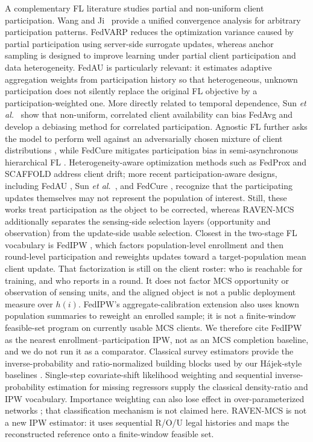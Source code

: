\documentclass[letterpaper,journal]{IEEEtran}
\begin{document}
A complementary FL literature studies partial and non-uniform client
participation.  Wang and Ji~\cite{wang2022unified} provide a unified convergence
analysis for arbitrary participation patterns.  FedVARP
\cite{jhunjhunwala2022fedvarp} reduces the optimization variance caused by
partial participation using server-side surrogate updates, whereas anchor
sampling \cite{wu2023anchor} is designed to improve learning under partial
client participation and data heterogeneity.  FedAU
\cite{wang2024lightweight} is particularly relevant: it estimates adaptive
aggregation weights from participation history so that heterogeneous,
unknown participation does not silently replace the original FL objective by
a participation-weighted one.  More directly related to temporal dependence,
Sun \emph{et al.}~\cite{sun2025debiasing} show that non-uniform, correlated
client availability can bias FedAvg and develop a debiasing method for
correlated participation.  Agnostic FL further asks the model to perform well
against an adversarially chosen mixture of client distributions
\cite{mohri2019agnostic}, while FedCure mitigates participation bias in
semi-asynchronous hierarchical FL \cite{chen2026fedcure}.  Heterogeneity-aware
optimization methods such as FedProx and SCAFFOLD
\cite{li2020fedprox,karimireddy2020scaffold} address client drift; more recent
participation-aware designs, including FedAU \cite{wang2024lightweight},
Sun \emph{et al.}~\cite{sun2025debiasing}, and FedCure \cite{chen2026fedcure},
recognize that the participating updates themselves may not represent the
population of interest.  Still, these works treat participation as the object
to be corrected, whereas RAVEN-MCS additionally separates the sensing-side
selection layers (opportunity and observation) from the update-side usable
selection.
Closest in the two-stage FL vocabulary is FedIPW
\cite{morishita2026who}, which factors population-level enrollment and then
round-level participation and reweights updates toward a target-population
mean client update.  That factorization is still on the client roster: who is
reachable for training, and who reports in a round.  It does not factor MCS
opportunity or observation of sensing units, and the aligned object is not a
public deployment measure over $h(i)$.  FedIPW's aggregate-calibration
extension also uses known population summaries to reweight an enrolled sample;
it is not a finite-window feasible-set program on currently usable MCS
clients.  We therefore cite FedIPW as the nearest enrollment--participation
IPW, not as an MCS completion baseline, and we do not run it as a comparator.
Classical survey estimators provide the inverse-probability and ratio-normalized
building blocks used by our H\'ajek-style baselines
\cite{horvitz1952generalization,hajek1971comment}.
Single-step covariate-shift likelihood weighting
\cite{shimodaira2000covariate} and sequential inverse-probability
estimation for missing regressors \cite{robins1994estimation} supply
the classical density-ratio and IPW vocabulary.
Importance weighting can also lose effect in over-parameterized
networks \cite{byrd2019importance}; that classification mechanism is
not claimed here.  RAVEN-MCS is not a
new IPW estimator: it uses sequential R/O/U legal histories and maps
the reconstructed reference onto a finite-window feasible set.
\end{document}

